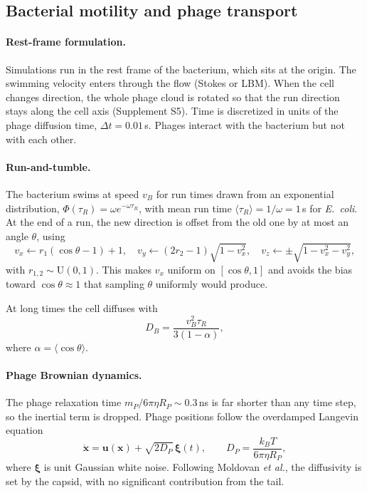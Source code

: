 \documentclass[12pt]{article}
\begin{document}
\subsection*{Bacterial motility and phage transport}
\paragraph{Rest-frame formulation.} Simulations run in the rest frame of the bacterium, which sits at the origin. The swimming velocity enters through the flow (Stokes or LBM). When the cell changes direction, the whole phage cloud is rotated so that the run direction stays along the cell axis (Supplement S5). Time is discretized in units of the phage diffusion time, $\Delta t=0.01$\,s\cite{joiner2019impact}. Phages interact with the bacterium but not with each other.

\paragraph{Run-and-tumble.} The bacterium swims at speed $v_B$ for run times drawn from an exponential distribution, $\Phi(\tau_R)=\omega e^{-\omega\tau_R}$, with mean run time $\langle\tau_R\rangle=1/\omega=1$\,s for \textit{E.~coli}\cite{texbook1,berg2004coli}. At the end of a run, the new direction is offset from the old one by at most an angle $\theta$, using
\begin{equation}
v_x\leftarrow r_1(\cos\theta-1)+1,\quad v_y\leftarrow(2r_2-1)\sqrt{1-v_x^2},\quad v_z\leftarrow\pm\sqrt{1-v_x^2-v_y^2},
\end{equation}
with $r_{1,2}\sim\mathrm{U}(0,1)$. This makes $v_x$ uniform on $[\cos\theta,1]$ and avoids the bias toward $\cos\theta\approx1$ that sampling $\theta$ uniformly would produce.

At long times the cell diffuses with
\begin{equation}\label{eq:DB}
D_B=\frac{v_B^2\tau_R}{3(1-\alpha)},
\end{equation}
where $\alpha=\langle\cos\theta\rangle$\cite{texbook1}.

\paragraph{Phage Brownian dynamics.} The phage relaxation time $m_P/6\pi\eta R_P\sim0.3$\,ns is far shorter than any time step, so the inertial term is dropped. Phage positions follow the overdamped Langevin equation
\begin{equation}\label{eq:langevin}
\dot{\bm x}=\bm u(\bm x)+\sqrt{2D_P}\,\bm\xi(t),\qquad D_P=\frac{k_BT}{6\pi\eta R_P},
\end{equation}
where $\bm\xi$ is unit Gaussian white noise. Following Moldovan \textit{et al.}\cite{moldovan2007kinetics}, the diffusivity is set by the capsid, with no significant contribution from the tail.
\end{document}
